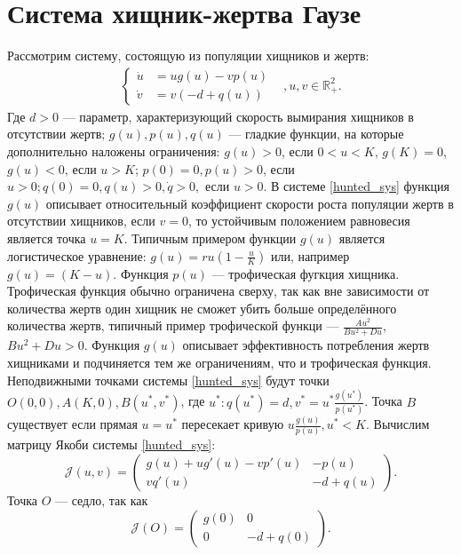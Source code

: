 \section{Система хищник-жертва Гаузе}
Рассмотрим систему, состоящую из популяции хищников и жертв:
\begin{equation}
	\begin{array}{lr}
		\left\lbrace
			\begin{array}{ll}
				\dot{u} &= ug(u) - vp(u)\\
				\dot{v} &= v(-d+q(u))
			\end{array}
		\right. &, u, v \in \mathbb{R}_{+}^{2}.
	\end{array}
	\label{hunted_sys}
\end{equation} 
Где $d > 0$ --- параметр, характеризующий скорость вымирания хищников в отсутствии жертв; $g(u), p(u), q(u)$ --- гладкие функции, на которые дополнительно наложены ограничения: $g(u) > 0$, если $0 < u < K$, $g(K) = 0$, $g(u) < 0$, если $u>K$; $p(0) = 0, p(u) > 0$, если $u > 0; q(0) = 0, q(u) > 0, \dot{q} > 0,$ если $u > 0$.
В системе \ref{hunted_sys} функция $g(u)$ описывает относительный коэффициент скорости роста популяции жертв в отсутствии хищников, если $v=0$, то устойчивым положением равновесия является точка $u = K$. Типичным примером функции $g(u)$ является логистическое уравнение: $g(u) = ru(1-\frac{u}{K})$ или, например $g(u) = (K - u)$. Функция $p(u)$ --- трофическая фугкция хищника. Трофическая функция обычно ограничена сверху, так как вне зависимости от количества жертв один хищник не сможет убить больше определённого количества жертв, типичный пример трофической функци --- $\frac{Au^2}{Bu^2+Du}$, $Bu^2+Du > 0$. Функция $g(u)$ описывает эффективность потребления жертв хищниками и подчиняется тем же ограничениям, что и трофическая функция.
Неподвижными точками системы \ref{hunted_sys} будут точки $O(0,0), A(K,0), B(u^*,v^*)$, где $u^* : q(u^*) = d, v^* = u^* \frac{g(u^*)}{p(u^*)}$. Точка $B$ существует если прямая $u = u^*$ пересекает кривую $u\frac{g(u)}{p(u)}, u^* < K$.
Вычислим матрицу Якоби системы \ref{hunted_sys}:
\begin{equation*}
	\mathcal{J}(u,v) = \left(
		\begin{array}{cc}
			g(u) + ug'(u)-vp'(u) & -p(u)\\
			vq'(u) & -d + q(u)
		\end{array}
	\right).
\end{equation*}
Точка $O$ --- седло, так как 
\begin{equation*}
	\mathcal{J}(O) = 
	\left(
		\begin{array}{cc}
			g(0) & 0\\
			0 & -d + q(0)
		\end{array}
	\right).
\end{equation*}
